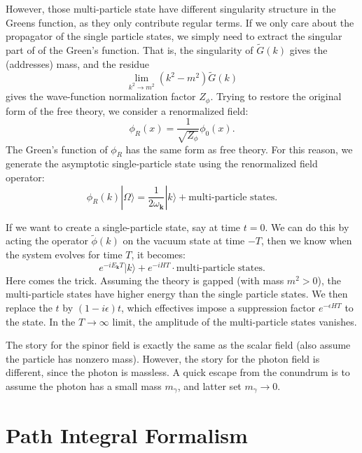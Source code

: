 \documentclass[aps,prb,superscriptaddress,nofootinbib]{revtex4}
\begin{document}
However, those multi-particle state have different singularity structure in the Greens function, as they only contribute regular terms.
If we only care about the propagator of the single particle states, we simply need to extract the singular part of of the Green's function.
That is, the singularity of $\tilde{G}(k)$ gives the (addresses) mass, and the residue 
\begin{equation*}
	\lim_{k^2 \rightarrow m^2} (k^2-m^2)\tilde{G}(k)
\end{equation*}
gives the wave-function normalization factor $Z_\phi$.
Trying to restore the original form of the free theory, we consider a renormalized field:
\begin{equation}
	\phi_R(x) = \frac{1}{\sqrt{Z_\phi}}\phi_0(x).
\end{equation}
The Green's function of $\phi_R$ has the same form as free theory.
For this reason, we generate the asymptotic single-particle state using the renormalized field operator:
\begin{equation}\label{eq:scalar-field-generate-particle}
	\phi_R(k)|\Omega\rangle = \frac{1}{2\omega_{\bm k}}|k\rangle + \text{multi-particle states}.
\end{equation}

If we want to create a single-particle state, say at time $t=0$.
We can do this by acting the operator $\tilde{\phi}(k)$ on the vacuum state at time $-T$, then we know when the system evolves for time $T$, it becomes:
\begin{equation}
	e^{-i E_{\bm k} T}|k\rangle + e^{-iHT} \cdot \text{multi-particle states}.
\end{equation}
Here comes the trick.
Assuming the theory is gapped (with mass $m^2>0$), the multi-particle states have higher energy than the single particle states.
We then replace the $t$ by $(1-i\epsilon)t$, which effectives impose a suppression factor $e^{-\epsilon H T}$ to the state.
In the $T\rightarrow \infty$ limit, the amplitude of the multi-particle states vanishes.

The story for the spinor field is exactly the same as the scalar field (also assume the particle has nonzero mass).
However, the story for the photon field is different, since the photon is massless.
A quick escape from the conundrum is to assume the photon has a small mass $m_\gamma$, and latter set $m_\gamma \rightarrow 0$.



\section{Path Integral Formalism}
\end{document}
